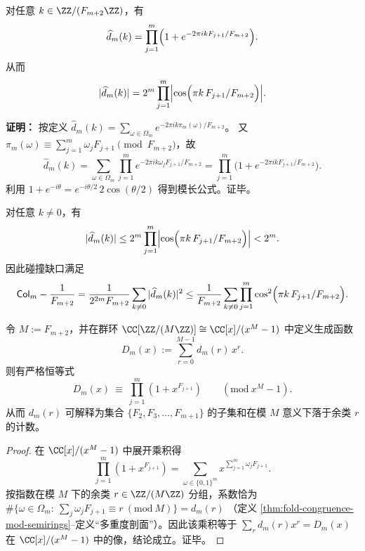 \begin{theorem}[多重度谱的乘法分解]
\label{thm:fold-spectrum-factorization}
对任意 $k\in\ZZ/(F_{m+2}\ZZ)$，有
\[
\widehat d_m(k)=\prod_{j=1}^m\Bigl(1+e^{-2\pi i k F_{j+1}/F_{m+2}}\Bigr).
\]
从而
\[
|\widehat d_m(k)|=2^m\prod_{j=1}^m\Bigl|\cos\Bigl(\pi k\,F_{j+1}/F_{m+2}\Bigr)\Bigr|.
\]
\end{theorem}

\textbf{证明：}
按定义
\(
\widehat d_m(k)=\sum_{\omega\in\Omega_m}e^{-2\pi i k\pi_m(\omega)/F_{m+2}}
\)。
又 $\pi_m(\omega)\equiv \sum_{j=1}^m \omega_j F_{j+1}\pmod{F_{m+2}}$，故
\[
\widehat d_m(k)=\sum_{\omega\in\Omega_m}\prod_{j=1}^m e^{-2\pi i k\omega_j F_{j+1}/F_{m+2}}
=\prod_{j=1}^m\bigl(1+e^{-2\pi i k F_{j+1}/F_{m+2}}\bigr).
\]
利用 $1+e^{-i\theta}=e^{-i\theta/2}\,2\cos(\theta/2)$ 得到模长公式。证毕。

\begin{corollary}[非平凡频谱的乘性上界]
\label{cor:fold-spectrum-nontrivial-bound}
对任意 $k\ne 0$，有
\[
|\widehat d_m(k)|\le 2^m\prod_{j=1}^m\Bigl|\cos\Bigl(\pi k\,F_{j+1}/F_{m+2}\Bigr)\Bigr|<2^m.
\]
因此碰撞缺口满足
\[
\mathsf{Col}_m-\frac{1}{F_{m+2}}=\frac{1}{2^{2m}F_{m+2}}\sum_{k\ne 0}|\widehat d_m(k)|^2
\le\frac{1}{F_{m+2}}\sum_{k\ne 0}\prod_{j=1}^m\cos^2\Bigl(\pi k\,F_{j+1}/F_{m+2}\Bigr).
\]
\end{corollary}

\begin{proposition}[循环子集和计数与群环生成函数恒等式]\label{prop:fold-multiplicity-group-algebra}
令 \(M:=F_{m+2}\)，并在群环
\(
\CC[\ZZ/(M\ZZ)]\cong \CC[x]/(x^{M}-1)
\)
中定义生成函数
\[
D_m(x):=\sum_{r=0}^{M-1} d_m(r)\,x^r.
\]
则有严格恒等式
\[
\boxed{\;
D_m(x)\ \equiv\ \prod_{j=1}^{m}\left(1+x^{F_{j+1}}\right)\qquad(\mathrm{mod}\ x^{M}-1).\;}
\]
从而 \(d_m(r)\) 可解释为集合 \(\{F_{2},F_{3},\dots,F_{m+1}\}\) 的子集和在模 \(M\) 意义下落于余类 \(r\) 的计数。
\end{proposition}

\begin{proof}
在 \(\CC[x]/(x^{M}-1)\) 中展开乘积得
\[
\prod_{j=1}^{m}\left(1+x^{F_{j+1}}\right)
=\sum_{\omega\in\{0,1\}^m}x^{\sum_{j=1}^m \omega_jF_{j+1}}.
\]
按指数在模 \(M\) 下的余类 \(r\in\ZZ/(M\ZZ)\) 分组，系数恰为
\(
\#\{\omega\in\Omega_m:\ \sum_j \omega_jF_{j+1}\equiv r\ (\mathrm{mod}\ M)\}
=d_m(r)
\)
（定义 \ref{thm:fold-congruence-mod-semirings}--定义“多重度剖面”）。因此该乘积等于 \(\sum_r d_m(r)x^r=D_m(x)\) 在 \(\CC[x]/(x^M-1)\) 中的像，结论成立。证毕。
\end{proof}

